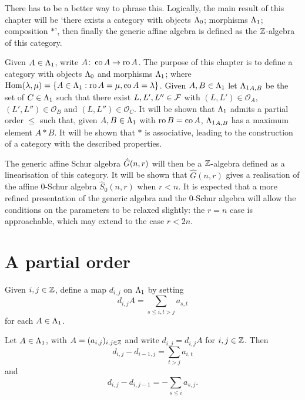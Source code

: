 \documentclass[a4paper, 11pt]{report}
\begin{document}
{\color{blue}There has to be a better way to phrase this. Logically, the main result of this chapter will be `there exists a category with objects ${\Lambda_0}$; morphisms ${\Lambda_1}$; composition $\ast$', then finally the generic affine algebra is defined as the $\mathbb{Z}$-algebra of this category.}

Given $A\in{\Lambda_1}$, write $A\colon\operatorname{co}{A}\to\operatorname{ro}{A}$. The purpose of this chapter is to define a category with objects ${\Lambda_0}$ and morphisms ${\Lambda_1}$; where $\operatorname{Hom}(\lambda,\mu) = \{A\in{\Lambda_1}: \operatorname{ro}{A}=\mu,\operatorname{co}{A}=\lambda\}$. Given $A,B\in{\Lambda_1}$ let ${\Lambda_1}_{A,B}$ be the set of $C\in{\Lambda_1}$ such that there exist $L,L',L''\in\mathcal{F}$ with $(L,L')\in\mathcal{O}_A$, $(L',L'')\in\mathcal{O}_B$ and $(L,L'')\in\mathcal{O}_C$. It will be shown that ${\Lambda_1}$ admits a partial order $\le$ such that, given $A,B\in{\Lambda_1}$ with $\operatorname{ro}{B}=\operatorname{co}{A}$, ${\Lambda_1}_{A,B}$ has a maximum element $A\ast B$. It will be shown that $\ast$ is associative, leading to the construction of a category with the described properties.

The generic affine Schur algebra $\hat{G}(n,r)$ will then be a $\mathbb{Z}$-algebra defined as a linearisation of this category. It will be shown that $\hat{G}(n,r)$ gives a realisation of the affine $0$-Schur algebra $\hat{S}_0(n,r)$ when $r<n$. It is expected that a more refined presentation of the generic algebra and the 0-Schur algebra will allow the conditions on the parameters to be relaxed slightly: the $r=n$ case is approachable, which may extend to the case $r<2n$.

\section{A partial order}

Given $i,j\in\mathbb{Z}$, define a map $d_{i,j}$ on ${\Lambda_1}$ by setting
\begin{equation*}
d_{i,j}A = \sum_{s\le i,t>j} a_{s,t}
\end{equation*}
for each $A\in{\Lambda_1}$.

\begin{lemma}\label{lemma:differentials}
Let $A\in{\Lambda_1}$, with $A=(a_{i,j})_{i,j\in\mathbb{Z}}$ and write $d_{i,j} = d_{i,j}A$ for $i,j\in\mathbb{Z}$. Then
\begin{equation*}
d_{i,j} - d_{i-1,j} = \sum_{t>j}a_{i,t}
\end{equation*}
and
\begin{equation*}
d_{i,j}-d_{i,j-1} = - \sum_{s\le i}a_{s,j}.
\end{equation*}
\end{lemma}
\end{document}
